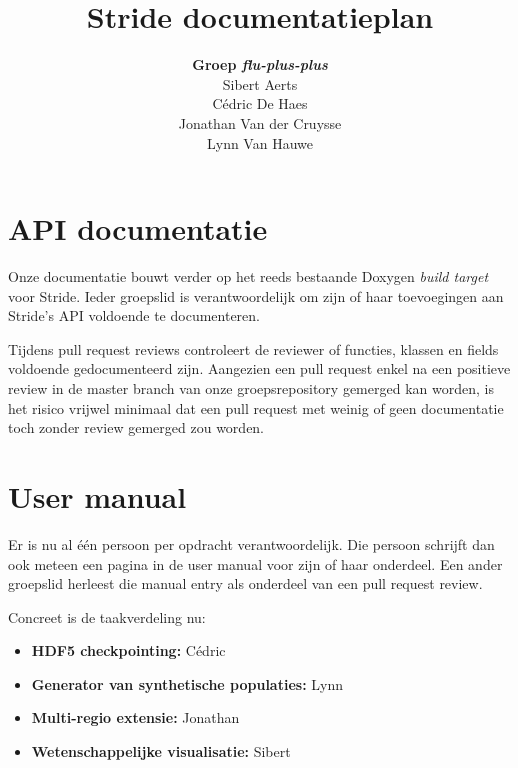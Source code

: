 \documentclass[12pt,a4paper]{article}
\author{\textbf{Groep \emph{flu-plus-plus}} \\ Sibert Aerts \\ Cédric De Haes \\ Jonathan Van der Cruysse \\ Lynn Van Hauwe}
\title{Stride documentatieplan}
\begin{document}
	
	\newcommand{\titleitem}[1]{\item \textbf{#1}}

	\maketitle
	
	\section{API documentatie}
	
	Onze documentatie bouwt verder op het reeds bestaande Doxygen \emph{build target} voor Stride. Ieder groepslid is verantwoordelijk om zijn of haar toevoegingen aan Stride's API voldoende te documenteren.
	
	Tijdens pull request reviews controleert de reviewer of functies, klassen en fields voldoende gedocumenteerd zijn. Aangezien een pull request enkel na een positieve review in de master branch van onze groepsrepository gemerged kan worden, is het risico vrijwel minimaal dat een pull request met weinig of geen documentatie toch zonder review gemerged zou worden.
	
	\section{User manual}
	
	Er is nu al \'e\'en persoon per opdracht verantwoordelijk. Die persoon schrijft dan ook meteen een pagina in de user manual voor zijn of haar onderdeel. Een ander groepslid herleest die manual entry als onderdeel van een pull request review.
	
	Concreet is de taakverdeling nu:
	
	\begin{itemize}
		\titleitem{HDF5 checkpointing:} Cédric
		\titleitem{Generator van synthetische populaties:} Lynn
		\titleitem{Multi-regio extensie:} Jonathan
		\titleitem{Wetenschappelijke visualisatie:} Sibert
	\end{itemize}
\end{document}
